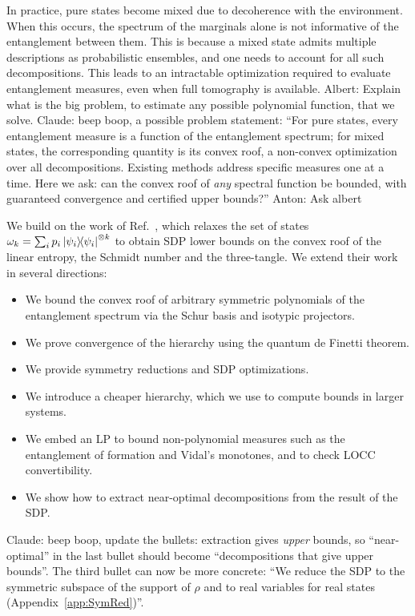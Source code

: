 \documentclass[aps,pra,twocolumn,showpacs,superscriptaddress,groupedaddress]{revtex4-2}
\newcommand{\albert}[1]{{\color{blue} Albert: #1}}
\newcommand{\anton}[1]{{\color{antongreen} Anton: #1}}
\newcommand{\claude}[1]{{\color{claudeorange} Claude: beep boop, #1}}
\begin{document}
In practice, pure states become mixed due to decoherence with the environment. When this occurs, the spectrum of the marginals alone is not informative of the entanglement between them. This is because a mixed state admits multiple descriptions as probabilistic ensembles, and one needs to account for all such decompositions. This leads to an intractable optimization required to evaluate entanglement measures, even when full tomography is available. \albert{Explain what is the big problem, to estimate any possible polynomial function, that we solve.}
\claude{a possible problem statement: ``For pure states, every entanglement measure is a function of the entanglement spectrum; for mixed states, the corresponding quantity is its convex roof, a non-convex optimization over all decompositions. Existing methods address specific measures one at a time. Here we ask: can the convex roof of \emph{any} spectral function be bounded, with guaranteed convergence and certified upper bounds?''}\anton{Ask albert}

We build on the work of Ref.~\cite{Toth2015CroofTP}, which relaxes the set of states $\omega_k = \sum_i p_i \dyad{\psi_i}^{\otimes k}$ to obtain SDP lower bounds on the convex roof of the linear entropy, the Schmidt number and the three-tangle. We extend their work in several directions:
\begin{itemize}
    \item We bound the convex roof of arbitrary symmetric polynomials of the entanglement spectrum via the Schur basis and isotypic projectors.
    \item We prove convergence of the hierarchy using the quantum de Finetti theorem.
    \item We provide symmetry reductions and SDP optimizations.
    \item We introduce a cheaper hierarchy, which we use to compute bounds in larger systems.
    \item We embed an LP to bound non-polynomial measures such as the entanglement of formation and Vidal's monotones, and to check LOCC convertibility.
    \item We show how to extract near-optimal decompositions from the result of the SDP.
\end{itemize}
\claude{update the bullets: extraction gives \emph{upper} bounds, so ``near-optimal'' in the last bullet should become ``decompositions that give upper bounds''. The third bullet can now be more concrete: ``We reduce the SDP to the symmetric subspace of the support of $\rho$ and to real variables for real states (Appendix~\ref{app:SymRed})''.}
\end{document}
